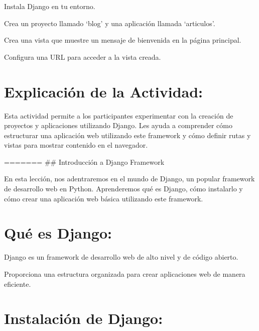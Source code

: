 \documentclass[
  a4paper,
  DIV=11,
  numbers=noendperiod,
  onepage,
  openany]{scrreprt}
\begin{document}
\begin{tcolorbox}[enhanced jigsaw, colbacktitle=quarto-callout-important-color!10!white, toprule=.15mm, leftrule=.75mm, titlerule=0mm, opacityback=0, rightrule=.15mm, opacitybacktitle=0.6, breakable, left=2mm, coltitle=black, title=\textcolor{quarto-callout-important-color}{\faExclamation}\hspace{0.5em}{Actividad Práctica:}, toptitle=1mm, bottomtitle=1mm, arc=.35mm, bottomrule=.15mm, colback=white, colframe=quarto-callout-important-color-frame]

Instala Django en tu entorno.

Crea un proyecto llamado `blog' y una aplicación llamada `articulos'.

Crea una vista que muestre un mensaje de bienvenida en la página
principal.

Configura una URL para acceder a la vista creada.

\end{tcolorbox}

\hypertarget{explicaciuxf3n-de-la-actividad-80}{%
\section{Explicación de la
Actividad:}\label{explicaciuxf3n-de-la-actividad-80}}

Esta actividad permite a los participantes experimentar con la creación
de proyectos y aplicaciones utilizando Django. Les ayuda a comprender
cómo estructurar una aplicación web utilizando este framework y cómo
definir rutas y vistas para mostrar contenido en el navegador.

======= \#\# Introducción a Django Framework

En esta lección, nos adentraremos en el mundo de Django, un popular
framework de desarrollo web en Python. Aprenderemos qué es Django, cómo
instalarlo y cómo crear una aplicación web básica utilizando este
framework.

\hypertarget{quuxe9-es-django-1}{%
\section{Qué es Django:}\label{quuxe9-es-django-1}}

Django es un framework de desarrollo web de alto nivel y de código
abierto.

Proporciona una estructura organizada para crear aplicaciones web de
manera eficiente.

\hypertarget{instalaciuxf3n-de-django-1}{%
\section{Instalación de Django:}\label{instalaciuxf3n-de-django-1}}
\end{document}
